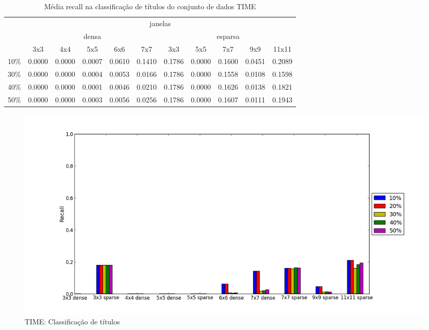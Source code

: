 \documentclass[a4paper,11pt]{article}
\begin{document}
  \begin{center}
    \begin{table}[p]
      \caption{Média recall na classificação de títulos do conjunto de dados TIME}
      \begin{tabular}{ l | c c c c c || c c c c c | }
        \cline{2-11}
        & \multicolumn{10}{|c|}{janelas} \\
        \cline{2-11}
        & \multicolumn{5}{c||}{densa} & \multicolumn{5}{c|}{esparsa} \\
        \cline{2-11}
        & 3x3 & 4x4 & 5x5 & 6x6 & 7x7 & 3x3 & 5x5 & 7x7 & 9x9 & 11x11 \\
        \hline
        \multicolumn{1}{|l|}{10\%}& 0.0000& 0.0000& 0.0007& 0.0610& 0.1410& 0.1786& 0.0000& 0.1600& 0.0451& 0.2089\\
        \multicolumn{1}{|l|}{30\%}& 0.0000& 0.0000& 0.0004& 0.0053& 0.0166& 0.1786& 0.0000& 0.1558& 0.0108& 0.1598\\
        \multicolumn{1}{|l|}{40\%}& 0.0000& 0.0000& 0.0001& 0.0046& 0.0210& 0.1786& 0.0000& 0.1626& 0.0138& 0.1821\\
        \multicolumn{1}{|l|}{50\%}& 0.0000& 0.0000& 0.0003& 0.0056& 0.0256& 0.1786& 0.0000& 0.1607& 0.0111& 0.1943\\
        \hline  
      \end{tabular}
      \label{tab:time_recall_heading}
    \end{table}
  \end{center}

  \begin{figure}[p]
    \centerline{\includegraphics[width=1.2\textwidth]{assets/experiment_charts/time_TextRegion_heading_recall_or_sensitivity.png}}
    \caption{TIME: Classificação de títulos}
    \label{fig:time_TextRegion_heading_recall_or_sensitivity}
  \end{figure}
\end{document}
